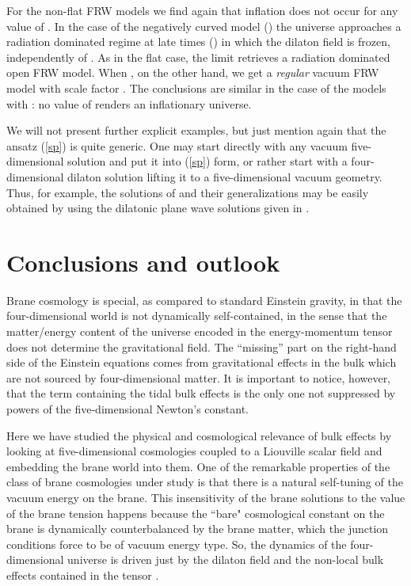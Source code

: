 \documentclass[prd,a4paper,twocolumn,superscriptaddress,nofootinbib,showpacs]{revtex4}
\begin{document}
For the non-flat FRW models we find again that inflation does not occur for any value of \coordHE{}. In the case of 
the negatively curved model (\coordHE{}) the universe approaches a radiation dominated regime at late times (\myHighlight{$\eta\rightarrow \infty$}\coordHE{})
in which the dilaton field is frozen, independently of \coordHE{}. As in the flat case, the limit \coordHE{} retrieves
a radiation dominated open FRW model. When \coordHE{}, on the other hand, we get a {\it regular} vacuum FRW model with
scale factor \coordHE{}. The conclusions are similar in the case of the models with \coordHE{}: no value of \coordHE{} renders
an inflationary universe.

We will not  present  further explicit  examples, but just mention again that the ansatz 
(\ref{sp}) is quite generic. One may start directly with any vacuum five-dimensional solution and put
it into (\ref{sp}) form, or rather start with a four-dimensional dilaton solution lifting it to a 
five-dimensional 
vacuum geometry. Thus, for example, the solutions of \cite{hlz}  and their generalizations may be
easily obtained by using the dilatonic plane wave solutions given in \cite{fkvm}.



\section{Conclusions and outlook}

Brane cosmology is special, as compared to standard Einstein gravity, in that the four-dimensional world is not
dynamically self-contained, in the sense that the matter/energy content of the universe encoded in the 
energy-momentum 
tensor does not determine the gravitational field. The ``missing'' part on the right-hand side of the Einstein equations
comes from gravitational effects in the bulk which are not sourced by four-dimensional matter. It is important to notice, 
however, that the term containing the tidal bulk effects is the only one not suppressed by powers of the five-dimensional 
Newton's constant.  

Here we have studied the physical and cosmological relevance of bulk effects by looking at 
five-dimensional 
cosmologies coupled to a Liouville scalar field and embedding the brane world into them. 
One of the remarkable properties of the class of brane cosmologies under study is that
there is a natural self-tuning of the vacuum energy on the brane. This insensitivity of the brane solutions
to the value of the brane tension happens because the 
``bare" cosmological constant on the brane is dynamically counterbalanced by the brane matter, which
the junction conditions force to be of vacuum energy type. So,
the dynamics of the four-dimensional
universe is driven just by the dilaton field and the non-local bulk effects contained in 
the tensor \coordHE{}. 
\end{document}
